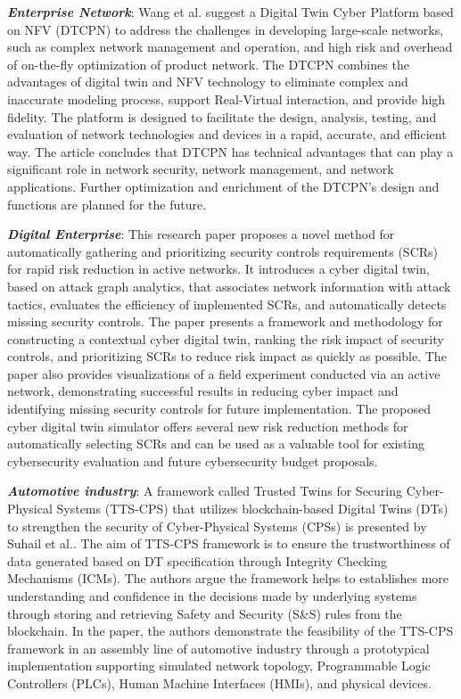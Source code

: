 \textbf{\textit{Enterprise Network}}: Wang et al.\cite{wangDTCPNDigitalTwin2022} suggest a Digital Twin Cyber Platform based on NFV (DTCPN) to address the challenges in developing large-scale networks, such as complex network management and operation, and high risk and overhead of on-the-fly optimization of product network. The DTCPN combines the advantages of digital twin and NFV technology to eliminate complex and inaccurate modeling process, support Real-Virtual interaction, and provide high fidelity. The platform is designed to facilitate the design, analysis, testing, and evaluation of network technologies and devices in a rapid, accurate, and efficient way. The article concludes that DTCPN has technical advantages that can play a significant role in network security, network management, and network applications. Further optimization and enrichment of the DTCPN's design and functions are planned for the future.

\textbf{\textit{Digital Enterprise}}: This\cite{hadarCyberDigitalTwin2020} research paper proposes a novel method for automatically gathering and prioritizing security controls requirements (SCRs) for rapid risk reduction in active networks. It introduces a cyber digital twin, based on attack graph analytics, that associates network information with attack tactics, evaluates the efficiency of implemented SCRs, and automatically detects missing security controls. The paper presents a framework and methodology for constructing a contextual cyber digital twin, ranking the risk impact of security controls, and prioritizing SCRs to reduce risk impact as quickly as possible. The paper also provides visualizations of a field experiment conducted via an active network, demonstrating successful results in reducing cyber impact and identifying missing security controls for future implementation. The proposed cyber digital twin simulator offers several new risk reduction methods for automatically selecting SCRs and can be used as a valuable tool for existing cybersecurity evaluation and future cybersecurity budget proposals.


\textbf{\textit{Automotive industry}}: A framework called Trusted Twins for Securing Cyber-Physical Systems (TTS-CPS) that utilizes blockchain-based Digital Twins (DTs) to strengthen the security of Cyber-Physical Systems (CPSs) is presented by Suhail et al.\cite{suhailSituationalAwareCyberphysical2022}. The aim of TTS-CPS framework is to ensure the trustworthiness of data generated based on DT specification through Integrity Checking Mechanisms (ICMs). The authors argue the framework helps to establishes more understanding and confidence in the decisions made by underlying systems through storing and retrieving Safety and Security (S\&S) rules from the blockchain. In the paper, the authors demonstrate the feasibility of the TTS-CPS framework in an assembly line of automotive industry through a prototypical implementation supporting simulated network topology, Programmable Logic Controllers (PLCs), Human Machine Interfaces (HMIs), and physical devices. 


